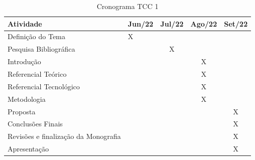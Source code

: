 \begin{table}[H]
\caption{Cronograma TCC 1}
\label{cronograma1}
\begin{tabular}{@{}llccc@{}}
\toprule
\textbf{\textbf{Atividade}}          & \textbf{Jun/22} & \multicolumn{1}{l}{\textbf{Jul/22}} & \multicolumn{1}{l}{\textbf{Ago/22}} & \multicolumn{1}{l}{\textbf{Set/22}} \\ \midrule
Definição do Tema                    & X               &                                     &                                     &                                     \\ \midrule
Pesquisa Bibliográfica               &                 & X                                   &                                     &                                     \\ \midrule
Introdução                           &                 &                                     & X                                   &                                     \\ \midrule
Referencial Teórico                  &                 &                                     & X                                   &                                     \\ \midrule
Referencial Tecnológico              &                 &                                     & X                                   &                                     \\ \midrule
Metodologia                          &                 &                                     & X                                   &                                     \\ \midrule
Proposta                             &                 &                                     &                                     & X                                   \\ \midrule
Conclusões Finais                    &                 &                                     &                                     & X                                   \\ \midrule
Revisões e finalização da Monografia &                 &                                     &                                     & X                                   \\ \midrule
Apresentação                         &                 &                                     &                                     & X                                   \\ \bottomrule
\end{tabular}
\end{table}


